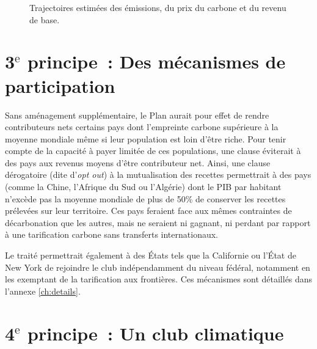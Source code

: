 \documentclass[a5paper,french]{memoir}
\begin{document}
\begin{figure}[h!]
  \caption{Trajectoires estimées des émissions, du prix du carbone et du revenu de base.}\label{fig:trajectory}
\end{figure}

\section{3$^\text{e}$ principe~: Des mécanismes de participation}

Sans aménagement supplémentaire, le Plan aurait pour effet de rendre contributeurs nets certains pays dont l'empreinte carbone supérieure à la moyenne mondiale même si leur population est loin d'être riche. Pour tenir compte de la capacité à payer limitée de ces populations, une clause éviterait à des pays aux revenus moyens d'être contributeur net. Ainsi, une clause dérogatoire (dite d'\textit{opt out}) à la mutualisation des recettes permettrait à des pays (comme la Chine, l'Afrique du Sud ou l'Algérie) dont le PIB par habitant n'excède pas la moyenne mondiale de plus de 50\% de conserver les recettes prélevées sur leur territoire. Ces pays feraient face aux mêmes contraintes de décarbonation que les autres, mais ne seraient ni gagnant, ni perdant par rapport à une tarification carbone sans transferts internationaux. 

Le traité permettrait également à des États tels que la Californie ou l'État de New York de rejoindre le club indépendamment du niveau fédéral, notamment en les exemptant de la tarification aux frontières. 
Ces mécanismes sont détaillés dans l'annexe \ref{ch:details}. 

\section{4$^\text{e}$ principe~: Un club climatique}
\end{document}
